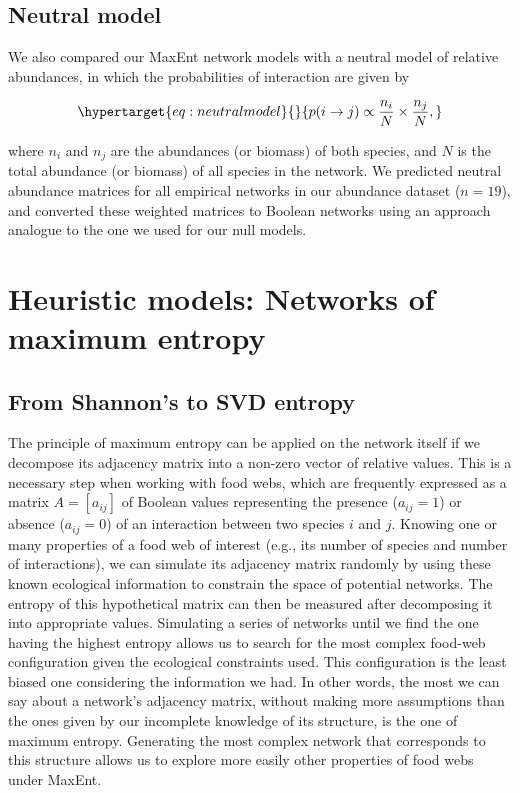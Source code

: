 \documentclass[11pt]{article}
\begin{document}
\hypertarget{neutral-model}{%
\subsection{Neutral model}\label{neutral-model}}

We also compared our MaxEnt network models with a neutral model of
relative abundances, in which the probabilities of interaction are given
by

\begin{equation}\protect\hypertarget{eq:neutralmodel}{}{p(i \rightarrow j) \propto \frac{n_i}{N} \times \frac{n_j}{N},}\label{eq:neutralmodel}\end{equation}

where \(n_i\) and \(n_j\) are the abundances (or biomass) of both
species, and \(N\) is the total abundance (or biomass) of all species in
the network. We predicted neutral abundance matrices for all empirical
networks in our abundance dataset (\(n = 19\)), and converted these
weighted matrices to Boolean networks using an approach analogue to the
one we used for our null models.

\hypertarget{heuristic-models-networks-of-maximum-entropy}{%
\section{Heuristic models: Networks of maximum
entropy}\label{heuristic-models-networks-of-maximum-entropy}}

\hypertarget{from-shannons-to-svd-entropy}{%
\subsection{From Shannon's to SVD
entropy}\label{from-shannons-to-svd-entropy}}

The principle of maximum entropy can be applied on the network itself if
we decompose its adjacency matrix into a non-zero vector of relative
values. This is a necessary step when working with food webs, which are
frequently expressed as a matrix \(A = [a_{ij}]\) of Boolean values
representing the presence (\(a_{ij} = 1\)) or absence (\(a_{ij} = 0\))
of an interaction between two species \(i\) and \(j\). Knowing one or
many properties of a food web of interest (e.g., its number of species
and number of interactions), we can simulate its adjacency matrix
randomly by using these known ecological information to constrain the
space of potential networks. The entropy of this hypothetical matrix can
then be measured after decomposing it into appropriate values.
Simulating a series of networks until we find the one having the highest
entropy allows us to search for the most complex food-web configuration
given the ecological constraints used. This configuration is the least
biased one considering the information we had. In other words, the most
we can say about a network's adjacency matrix, without making more
assumptions than the ones given by our incomplete knowledge of its
structure, is the one of maximum entropy. Generating the most complex
network that corresponds to this structure allows us to explore more
easily other properties of food webs under MaxEnt.
\end{document}
